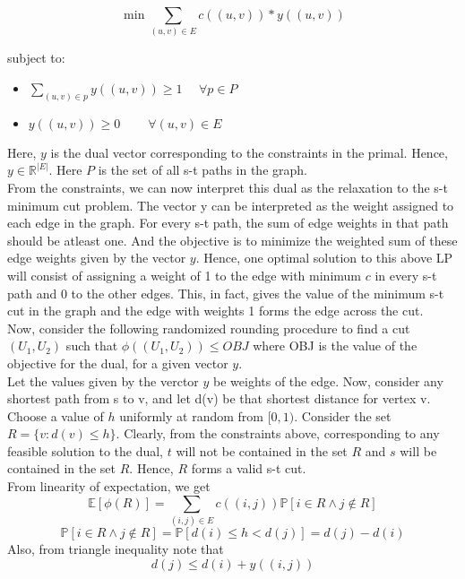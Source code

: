 \documentclass[BTech]{iitmdiss}
\begin{document}
	  $$\min \displaystyle\sum_{(u,v) \in E} c((u,v)) \ast y((u,v))$$
	  
	  subject to:
	  \begin{itemize}
	   \item 
	    $\displaystyle \sum_{(u,v) \in p} y((u,v)) \geq 1~~~~~~\forall p \in P$
	   \item
	    $y((u,v)) \geq 0 ~~~~~~~~~~ \forall (u,v) \in E$
	   
	  \end{itemize}

	  Here, $y$ is the dual vector corresponding to the constraints in the primal. Hence, $y \in \mathbb{R}^{|E|}$. Here $P$ is the set of all
	  s-t paths in the graph. \\
	  
	  From the constraints, we can now interpret this dual as the relaxation to the s-t minimum cut problem. The vector y can be interpreted 
	  as the weight assigned to each edge in the graph. For every s-t path, the sum of edge weights in that path should be atleast one. And the 
	  objective is to minimize the weighted sum of these edge weights given by the vector $y$. Hence, one optimal solution to this above LP
	  will consist of assigning a weight of 1 to the edge with minimum $c$ in every s-t path and 0 to the other edges. This, in fact, gives the 
	  value of the minimum s-t cut in the graph and the edge with weights 1 forms the edge across the cut. \\
	  
	  Now, consider the following randomized rounding procedure to find a cut $(U_1, U_2)$ such that $\phi((U_1, U_2)) \leq OBJ$ where OBJ is 
	  the value of the objective for the dual, for a given vector $y$. \\
	  
	  Let the values given by the verctor $y$ be weights of the edge. Now, consider any shortest path from s to v, and let d(v) be that 
	  shortest distance for vertex v. Choose a value of $h$ uniformly at random from $[0,1)$. Consider the set 
	  $R = \{v:d(v) \leq h\}$. Clearly, from the constraints above, corresponding to any feasible solution to the dual, $t$ will not be contained 
	  in the set $R$ and $s$ will be contained in the set $R$. Hence, $R$ forms a valid s-t cut. \\
	  
	  From linearity of expectation, we get
	  $$\mathbb{E}[\phi(R)] = \displaystyle\sum_{(i,j) \in E} c((i,j)) \mathbb{P}[i \in R \wedge j \notin R]$$
	  $$\mathbb{P}[i \in R \wedge j \notin R] = \mathbb{P}[d(i) \leq h < d(j)] = d(j)-d(i)$$
	  Also, from triangle inequality note that 
	  $$d(j) \leq d(i) + y((i,j))$$
	  
\end{document}
